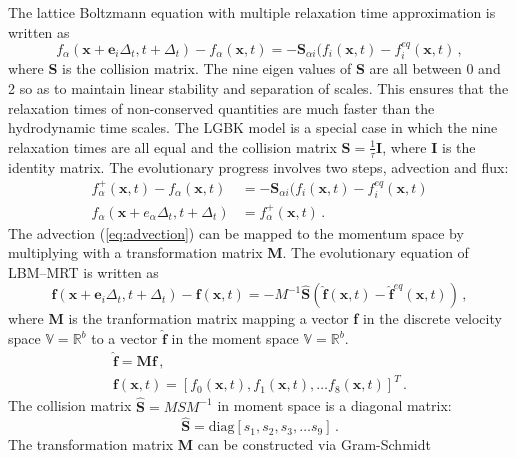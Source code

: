 The lattice Boltzmann equation with multiple relaxation time approximation is 
written as
%
\begin{equation}
f_{\alpha}(\mathbf{x}+\mathbf{e}_i\Delta_t, t+ 
\Delta_t)-f_{\alpha}(\mathbf{x},t)=-\mathbf{S}_{\alpha 
	i}(f_i(\mathbf{x},t)-f_i^{eq}(\mathbf{x},t)\,,
\end{equation}
%
\noindent where \textbf{S} is the collision matrix. The nine eigen values of 
\textbf{S} are all between 0 and 2 so as to maintain linear stability and 
separation of scales. This ensures that the relaxation times of non-conserved 
quantities are much faster than the hydrodynamic time scales. The LGBK model is 
a special case in which the nine relaxation times are all equal and the 
collision matrix $\mathbf{S}=\frac{1}{\tau}\mathbf{I}$, where \textbf{I} is the 
identity matrix. The evolutionary progress involves two steps, advection and 
flux:
%
\begin{align}
f_{\alpha}^+(\mathbf{x},t)-f_{\alpha}(\mathbf{x},t) & = -\mathbf{S}_{\alpha 
i}(f_i(\mathbf{x},t)-f_i^{eq}(\mathbf{x},t) \label{eq:advection}\\
f_{\alpha}(\mathbf{x}+e_{\alpha}\Delta_t, t+\Delta_t) & = 
f_{\alpha}^+(\mathbf{x},t)\,.
\end{align}
%
The advection (\cref{eq:advection}) can be mapped to the 
momentum space by multiplying with a transformation matrix \textbf{M}. The 
evolutionary equation of LBM--MRT is written as
%
\begin{equation}
\mathbf{f}(\mathbf{x}+\mathbf{e}_i\Delta_t, t+ 
\Delta_t)-\mathbf{f}(\mathbf{x},t)=-M^{-1}\hat{\mathbf{S}}(\hat{\mathbf{f}}
(\mathbf{x},t)-\hat{\mathbf{f}}^{eq}(\mathbf{x},t))\,,
\end{equation}
%
\noindent where \textbf{M} is the tranformation matrix mapping a vector 
\textbf{f} in the discrete velocity space $\mathds{V}=\mathds{R}^b$ to a vector 
$\hat{\mathbf{f}}$ in the moment space $\mathds{V}=\mathds{R}^b$. 
%
\begin{gather}
\hat{\mathbf{f}}= \mathbf{M}\mathbf{f}\,, \\ 
\mathbf{f}(\mathbf{x},t) =\left[f_0(\mathbf{x},t),f_1(\mathbf{x},t),\dots 
f_8(\mathbf{x},t)\right]^T\,.
\end{gather}
%
The collision matrix $\hat{\mathbf{S}} = MSM^{-1}$ in moment space is 
a diagonal matrix:
\begin{equation*}
\hat{\mathbf{S}} =\mbox{diag} \left[ s_1, s_2, s_3, \dots s_9  \right]\,.
\end{equation*} 
%
The transformation matrix \textbf{M} can be constructed via Gram-Schmidt 
